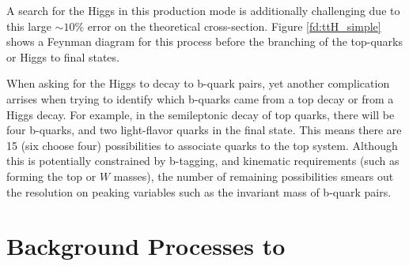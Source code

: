 \noindent A search for the Higgs in this production mode is
additionally challenging due to this large $\sim10\%$ error on the
theoretical cross-section.  Figure \ref{fd:ttH_simple} shows a Feynman
diagram for this process before the branching of the top-quarks or
Higgs to final states.  

\par When asking for the Higgs to decay to b-quark
pairs, yet another complication arrises when trying to identify which
b-quarks came from a top decay or from a Higgs decay.  For example, in
the semileptonic decay of top quarks, there will be four b-quarks, and
two light-flavor quarks in the final state.  This means there are 15
(six choose four) possibilities to associate quarks to the top
system.  Although this is potentially constrained by b-tagging, and
kinematic requirements (such as forming the top or $W$ masses), the
number of remaining possibilities smears out the resolution on peaking
variables such as the invariant mass of b-quark pairs.  


\section{Background Processes to \ttH}
\label{ttH_backgrounds_overview}

